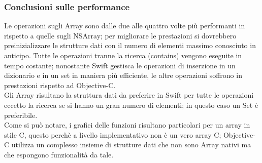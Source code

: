 \subsubsection{Conclusioni sulle performance}
Le operazioni sugli Array sono dalle due alle quattro volte più performanti in rispetto a quelle sugli NSArray; per migliorare le prestazioni si dovrebbero preinizializzare le strutture dati con il numero di elementi massimo conosciuto in anticipo. Tutte le operazioni tranne la ricerca (contains) vengono eseguite in tempo costante; nonostante Swift gestisca le operazioni di inserzione in un dizionario e in un set in maniera più efficiente, le altre operazioni soffrono in prestazioni rispetto ad Objective-C.\\
Gli Array risultano la struttura dati da preferire in Swift per tutte le operazioni eccetto la ricerca se si hanno un gran numero di elementi; in questo caso un Set è preferibile.\\
Come si può notare, i grafici delle funzioni risultano particolari per un array in stile C, questo perchè a livello implementativo non è un vero array C; Objective-C utilizza un complesso insieme di strutture dati che non sono Array nativi ma che espongono funzionalità da tale.
    
    
    
    


